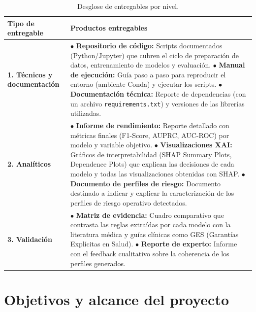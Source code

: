 \begin{table}[htbp]
\centering
\footnotesize
\setlength{\tabcolsep}{4pt}
\renewcommand{\arraystretch}{1.15}
\caption{Desglose de entregables por nivel.}
\label{tab:entregables}
\begin{tabular}{|l|l|}
\hline
\parbox[t]{3.5cm}{\textbf{Tipo de entregable}} & \parbox[t]{9.2cm}{\textbf{Productos entregables}} \\ \hline
\parbox[t]{3.5cm}{\textbf{1. Técnicos y documentación}} & \parbox[t]{9.2cm}{$\bullet$ \textbf{Repositorio de código:} Scripts documentados (Python/Jupyter) que cubren el ciclo de preparación de datos, entrenamiento de modelos y evaluación. \\ $\bullet$ \textbf{Manual de ejecución:} Guía paso a paso para reproducir el entorno (ambiente Conda) y ejecutar los scripts. \\ $\bullet$ \textbf{Documentación técnica:} Reporte de dependencias (con un archivo \texttt{requirements.txt}) y versiones de las librerías utilizadas.} \\ \hline
\parbox[t]{3.5cm}{\textbf{2. Analíticos}} & \parbox[t]{9.2cm}{$\bullet$ \textbf{Informe de rendimiento:} Reporte detallado con métricas finales (F1-Score, AUPRC, AUC-ROC) por modelo y variable objetivo. \\ $\bullet$ \textbf{Visualizaciones XAI:} Gráficos de interpretabilidad (SHAP Summary Plots, Dependence Plots) que explican las decisiones de cada modelo y todas las visualizaciones obtenidas con SHAP. \\ $\bullet$ \textbf{Documento de perfiles de riesgo:} Documento destinado a indicar y explicar la caracterización de los perfiles de riesgo operativo detectados.} \\ \hline
\parbox[t]{3.5cm}{\textbf{3. Validación}} & \parbox[t]{9.2cm}{$\bullet$ \textbf{Matriz de evidencia:} Cuadro comparativo que contrasta las reglas extraídas por cada modelo con la literatura médica y guías clínicas como GES (Garantías Explícitas en Salud). \\ $\bullet$ \textbf{Reporte de experto:} Informe con el feedback cualitativo sobre la coherencia de los perfiles generados.} \\ \hline
\end{tabular}
\end{table}


\section{Objetivos y alcance del proyecto}
\label{intro:objetivos}

